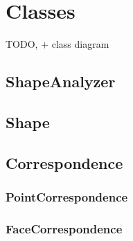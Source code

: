 
\chapter{Classes}

TODO, + class diagram

\section{ShapeAnalyzer}

\section{Shape}

\section{Correspondence}

\subsection{PointCorrespondence}

\subsection{FaceCorrespondence}